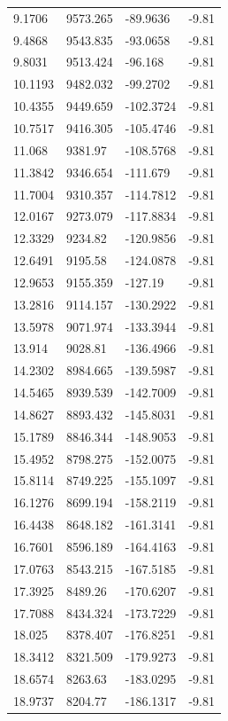 \begin{table}[H]
\begin{tabular}{llll}
9.1706 & 9573.265 & -89.9636 & -9.81 \\
9.4868 & 9543.835 & -93.0658 & -9.81 \\
9.8031 & 9513.424 & -96.168 & -9.81 \\
10.1193 & 9482.032 & -99.2702 & -9.81 \\
10.4355 & 9449.659 & -102.3724 & -9.81 \\
10.7517 & 9416.305 & -105.4746 & -9.81 \\
11.068 & 9381.97 & -108.5768 & -9.81 \\
11.3842 & 9346.654 & -111.679 & -9.81 \\
11.7004 & 9310.357 & -114.7812 & -9.81 \\
12.0167 & 9273.079 & -117.8834 & -9.81 \\
12.3329 & 9234.82 & -120.9856 & -9.81 \\
12.6491 & 9195.58 & -124.0878 & -9.81 \\
12.9653 & 9155.359 & -127.19 & -9.81 \\
13.2816 & 9114.157 & -130.2922 & -9.81 \\
13.5978 & 9071.974 & -133.3944 & -9.81 \\
13.914 & 9028.81 & -136.4966 & -9.81 \\
14.2302 & 8984.665 & -139.5987 & -9.81 \\
14.5465 & 8939.539 & -142.7009 & -9.81 \\
14.8627 & 8893.432 & -145.8031 & -9.81 \\
15.1789 & 8846.344 & -148.9053 & -9.81 \\
15.4952 & 8798.275 & -152.0075 & -9.81 \\
15.8114 & 8749.225 & -155.1097 & -9.81 \\
16.1276 & 8699.194 & -158.2119 & -9.81 \\
16.4438 & 8648.182 & -161.3141 & -9.81 \\
16.7601 & 8596.189 & -164.4163 & -9.81 \\
17.0763 & 8543.215 & -167.5185 & -9.81 \\
17.3925 & 8489.26 & -170.6207 & -9.81 \\
17.7088 & 8434.324 & -173.7229 & -9.81 \\
18.025 & 8378.407 & -176.8251 & -9.81 \\
18.3412 & 8321.509 & -179.9273 & -9.81 \\
18.6574 & 8263.63 & -183.0295 & -9.81 \\
18.9737 & 8204.77 & -186.1317 & -9.81 \\

\end{tabular}
\end{table}
